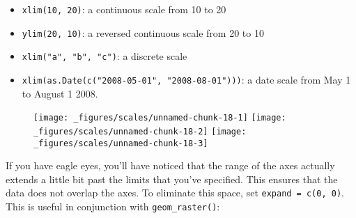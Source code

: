 \begin{itemize}
\tightlist
\item
  \texttt{xlim(10,\ 20)}: a continuous scale from 10 to 20
\item
  \texttt{ylim(20,\ 10)}: a reversed continuous scale from 20 to 10
\item
  \texttt{xlim("a",\ "b",\ "c")}: a discrete scale
\item
  \texttt{xlim(as.Date(c("2008-05-01",\ "2008-08-01")))}: a date scale
  from May 1 to August 1 2008.
\end{itemize}

\begin{Shaded}
\begin{Highlighting}[]
\OperatorTok{+}\StringTok{ }\NormalTok{(}\NormalTok{, }\NormalTok{)}
\OperatorTok{+}\StringTok{ }\NormalTok{(}\NormalTok{, }\NormalTok{)}
\OperatorTok{+}\StringTok{ }\NormalTok{(} \NormalTok{(}\NormalTok{, }\NormalTok{))}
\end{Highlighting}
\end{Shaded}

\begin{figure}[H]
  \texttt{[image: \_figures/scales/unnamed-chunk-18-1]}%
  \texttt{[image: \_figures/scales/unnamed-chunk-18-2]}%
  \texttt{[image: \_figures/scales/unnamed-chunk-18-3]}
\end{figure}

If you have eagle eyes, you'll have noticed that the range of the axes
actually extends a little bit past the limits that you've specified.
This ensures that the data does not overlap the axes. To eliminate this
space, set \texttt{expand\ =\ c(0,\ 0)}. This is useful in conjunction
with \texttt{geom\_raster()}: 

